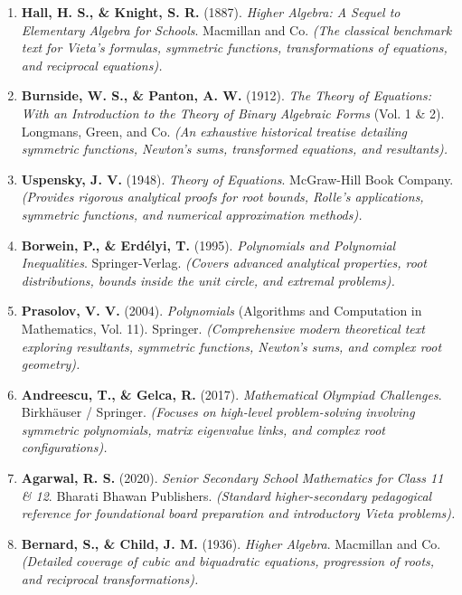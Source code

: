 \documentclass[10pt,a4paper]{article}
\begin{document}
\begin{enumerate}[leftmargin=*]
    \item \textbf{Hall, H. S., \& Knight, S. R.} (1887). \textit{Higher Algebra: A Sequel to Elementary Algebra for Schools}. Macmillan and Co. 
    \textit{(The classical benchmark text for Vieta's formulas, symmetric functions, transformations of equations, and reciprocal equations).}
    
    \item \textbf{Burnside, W. S., \& Panton, A. W.} (1912). \textit{The Theory of Equations: With an Introduction to the Theory of Binary Algebraic Forms} (Vol. 1 \& 2). Longmans, Green, and Co.
    \textit{(An exhaustive historical treatise detailing symmetric functions, Newton's sums, transformed equations, and resultants).}

    \item \textbf{Uspensky, J. V.} (1948). \textit{Theory of Equations}. McGraw-Hill Book Company.
    \textit{(Provides rigorous analytical proofs for root bounds, Rolle's applications, symmetric functions, and numerical approximation methods).}

    \item \textbf{Borwein, P., \& Erdélyi, T.} (1995). \textit{Polynomials and Polynomial Inequalities}. Springer-Verlag.
    \textit{(Covers advanced analytical properties, root distributions, bounds inside the unit circle, and extremal problems).}

    \item \textbf{Prasolov, V. V.} (2004). \textit{Polynomials} (Algorithms and Computation in Mathematics, Vol. 11). Springer.
    \textit{(Comprehensive modern theoretical text exploring resultants, symmetric functions, Newton's sums, and complex root geometry).}

    \item \textbf{Andreescu, T., \& Gelca, R.} (2017). \textit{Mathematical Olympiad Challenges}. Birkhäuser / Springer.
    \textit{(Focuses on high-level problem-solving involving symmetric polynomials, matrix eigenvalue links, and complex root configurations).}

    \item \textbf{Agarwal, R. S.} (2020). \textit{Senior Secondary School Mathematics for Class 11 \& 12}. Bharati Bhawan Publishers.
    \textit{(Standard higher-secondary pedagogical reference for foundational board preparation and introductory Vieta problems).}

    \item \textbf{Bernard, S., \& Child, J. M.} (1936). \textit{Higher Algebra}. Macmillan and Co.
    \textit{(Detailed coverage of cubic and biquadratic equations, progression of roots, and reciprocal transformations).}


\end{enumerate}
\end{document}
